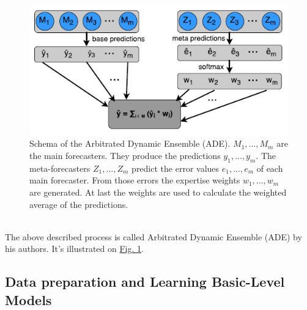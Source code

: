 \documentclass[runningheads,a4paper]{llncs}[2015/06/24]
\begin{document}
\begin{figure}[h]
\centering
\includegraphics[width=\textwidth]{adeSchema}
\caption{Schema of the Arbitrated Dynamic Ensemble (ADE). $M_1, ... ,M_m$ are the main forecasters. They produce the predictions $y_1, ... ,y_m$. The meta-forecasters $Z_1, ... ,Z_m$ predict the error values $e_1, ... ,e_m$ of each main forecaster. From those errors the expertise weights $w_1, ... ,w_m$ are generated. At last the weights are used to calculate the weighted average of the predictions. \cite{VtorCerqueira2017}}
\label{fig:adeSchema}
\end{figure} 
 
\vspace{-\topsep}
\hspace{1cm}\\ The above described process is called Arbitrated Dynamic Ensemble (ADE) by his authors. It's illustrated on \hyperref[fig:adeSchema]{Fig. \ref{fig:adeSchema}}. 

\subsection{Data preparation and Learning Basic-Level Models}
\end{document}
